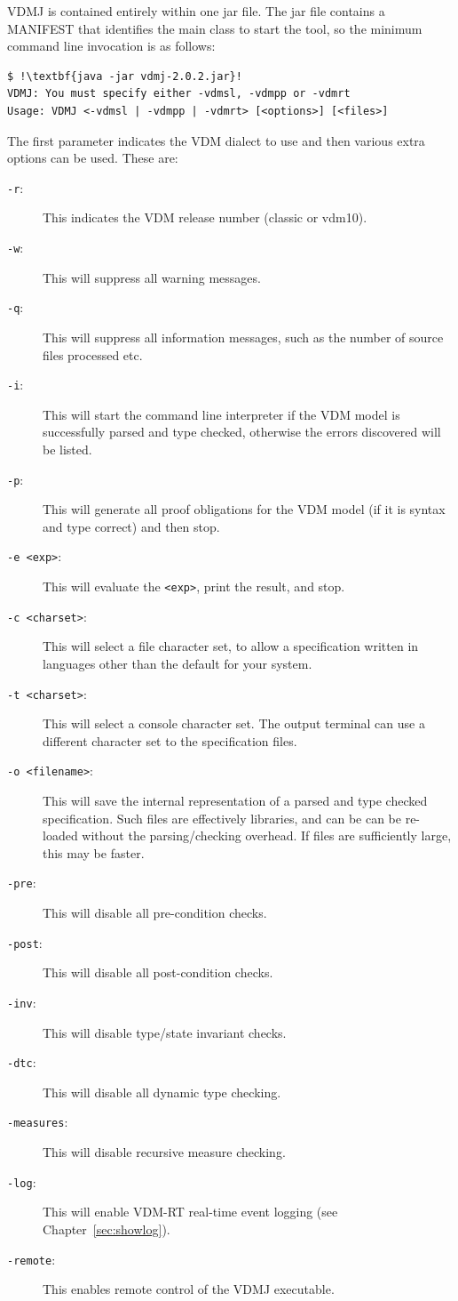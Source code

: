 \documentclass{overturerepchap}
\begin{document}
VDMJ is contained entirely within one jar file. The jar
file contains a MANIFEST that identifies the main class to start the
tool, so the minimum command line invocation is as follows:

\lstset{style=tool,language=}
\begin{lstlisting}
$ !\textbf{java -jar vdmj-2.0.2.jar}!
VDMJ: You must specify either -vdmsl, -vdmpp or -vdmrt
Usage: VDMJ <-vdmsl | -vdmpp | -vdmrt> [<options>] [<files>]
\end{lstlisting}
\lstset{style=mystyle}
\lstset{language=VDM++}

The first parameter indicates the VDM dialect to use and then
various extra options can be used. These are:

\begin{description}
\item[\texttt{-r}:] This indicates the VDM release number (classic or vdm10).
\item[\texttt{-w}:] This will suppress all warning messages.
\item[\texttt{-q}:] This will suppress all information messages, such as
 the number of source files processed etc.
\item[\texttt{-i}:] This will start the command line interpreter if the VDM
  model is successfully parsed and type checked, otherwise the errors discovered
  will be listed.
\item[\texttt{-p}:] This will generate all proof obligations for the
  VDM model (if it is syntax and type correct) and then stop.
\item[\texttt{-e <exp>}:] This will evaluate the \texttt{<exp>}, print
  the result, and stop.
\item[\texttt{-c <charset>}:] This will select a file character set, to
allow a specification written in languages other than the default for your system. 
\item[\texttt{-t <charset>}:] This will select a console character set. The output
terminal can use a different character set to the specification files.
\item[\texttt{-o <filename>}:] This will save the internal
  representation of a parsed and type checked spe\-ci\-fication. Such files are
  effectively libraries, and can be can be re-loaded without the
  parsing/checking overhead. If files are sufficiently large, this may be faster.
\item[\texttt{-pre}:] This will disable all pre-condition checks.
\item[\texttt{-post}:] This will disable all post-condition checks.
\item[\texttt{-inv}:] This will disable type/state invariant checks.
\item[\texttt{-dtc}:] This will disable all dynamic type checking.
\item[\texttt{-measures}:] This will disable recursive measure checking.
\item[\texttt{-log}:] This will enable VDM-RT real-time event logging (see Chapter~\ref{sec:showlog}).
\item[\texttt{-remote}:] This enables remote control of the VDMJ executable.
\end{description}
\end{document}
